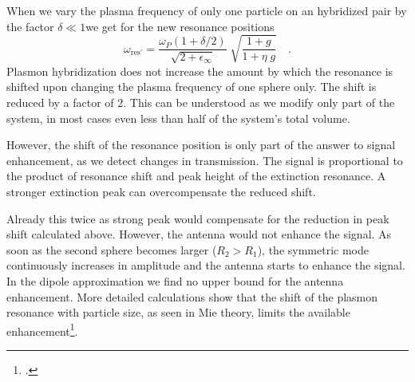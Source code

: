 When we vary the plasma frequency of only one particle on an hybridized pair by the factor
$\delta \ll 1$we get for the  new
resonance positions
%
\begin{equation}  
 \omega_{\text{res'}} = \frac{\omega_P (1 + \delta / 2)}{\sqrt{2 + \epsilon_{\infty}} }
 \; \sqrt{ \frac{1 + g}{ 1 +  \eta \; g}} \quad .
\end{equation}
Plasmon hybridization does not increase the amount by which the resonance is
shifted upon changing the plasma frequency of one sphere only. The shift is reduced by a factor of $2$. This can be understood
as we modify only part of the system,  in most cases even less than half of the
system's total volume.


However, the shift of the resonance position is only part of the answer to
signal enhancement, as we detect changes in transmission. The signal is
proportional to the product of resonance shift and peak height of the extinction
resonance. A stronger extinction peak can overcompensate the reduced shift. 

Already this twice as strong peak would compensate for the
reduction in peak shift calculated above. However, the antenna would not
enhance the signal. As soon as the second sphere becomes larger ($R_2 > R_1$),
the symmetric mode continuously increases in amplitude and the antenna starts to
enhance the signal. In the dipole approximation we find  no upper bound for the
antenna enhancement. More detailed calculations show that the shift of the plasmon resonance with particle size, as seen in Mie theory, limits the available enhancement\footcite{Schumacher16}. 





\printbibliography[segment=\therefsegment,heading=subbibliography]
